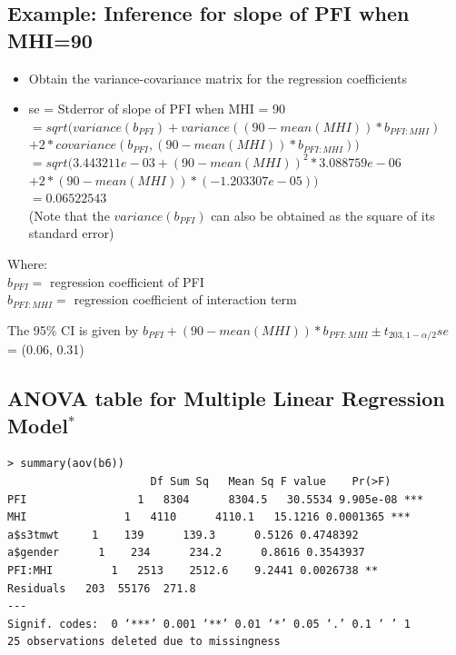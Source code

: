 \documentclass[
]{book}
\providecommand{\tightlist}{%
  \setlength{\itemsep}{0pt}\setlength{\parskip}{0pt}}
\begin{document}
\hypertarget{example-inference-for-slope-of-pfi-when-mhi90}{%
\subsection{Example: Inference for slope of PFI when MHI=90}\label{example-inference-for-slope-of-pfi-when-mhi90}}

\begin{itemize}
\tightlist
\item
  Obtain the variance-covariance matrix for the regression coefficients
\item
  se = Stderror of slope of PFI when MHI = 90\\
  \(= sqrt(variance(b_{PFI}) + variance((90-mean(MHI))*b_{PFI:MHI})\)\\
  \(+2*covariance(b_{PFI},(90-mean(MHI))*b_{PFI:MHI}))\)\\
  \(= sqrt(3.443211e-03 +(90-mean(MHI))^2* 3.088759e-06\)\\
  \(+2*(90-mean(MHI)) * (-1.203307e-05))\)\\
  \(= 0.06522543\)\\
  (Note that the \(variance(b_{PFI})\) can also be obtained as the square of its standard error)
\end{itemize}

Where:\\
\(b_{PFI}=\) regression coefficient of PFI\\
\(b_{PFI:MHI} =\) regression coefficient of interaction term

The 95\% CI is given by \(b_{PFI} + (90-mean(MHI))*b_{PFI:MHI}± t_{203,1-α/2}se\)\\
= (0.06, 0.31)

\hypertarget{anova-table-for-multiple-linear-regression-model}{%
\subsection{\texorpdfstring{ANOVA table for Multiple Linear Regression Model\(^*\)}{ANOVA table for Multiple Linear Regression Model\^{}*}}\label{anova-table-for-multiple-linear-regression-model}}

\begin{verbatim}
> summary(aov(b6))
                      Df Sum Sq   Mean Sq F value    Pr(>F)    
PFI                 1   8304      8304.5   30.5534 9.905e-08 ***
MHI               1   4110      4110.1   15.1216 0.0001365 ***
a$s3tmwt     1    139      139.3      0.5126 0.4748392    
a$gender      1    234      234.2      0.8616 0.3543937    
PFI:MHI         1   2513    2512.6    9.2441 0.0026738 ** 
Residuals   203  55176  271.8                      
---
Signif. codes:  0 ‘***’ 0.001 ‘**’ 0.01 ‘*’ 0.05 ‘.’ 0.1 ‘ ’ 1 
25 observations deleted due to missingness
\end{verbatim}
\end{document}
